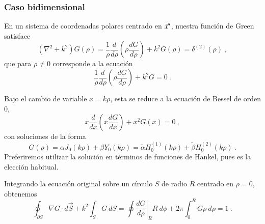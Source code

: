 \subsubsection{Caso bidimensional}

En un sistema de coordenadas polares centrado en $\vec{x}'$, nuestra función de Green satisface
\begin{equation}
    (\nabla^2 + k^2)G(\rho) = \frac{1}{\rho} \frac{d}{d\rho} \left( \rho \frac{dG}{d\rho} \right) + k^2 G(\rho) = \delta^{(2)}(\rho) \ ,
\end{equation}
que para $\rho \neq 0$ corresponde a la ecuación
\begin{equation}
    \frac{1}{\rho} \frac{d}{d\rho} \left( \rho \frac{dG}{d\rho} \right) + k^2 G = 0 \ .
\end{equation}

Bajo el cambio de variable $x = k\rho$, esta se reduce a la ecuación de Bessel de orden 0,
\begin{equation}
    x \frac{d}{dx}\left( x \frac{dG}{dx} \right)  + x^2 G(x) = 0 \ ,
\end{equation}
con soluciones de la forma
\begin{equation}\label{eq:solucion_green_Helmholtz_2d}
    G(\rho) = \alpha J_0(k\rho) + \beta Y_0(k\rho) = \tilde{\alpha} H_0^{(1)}(k\rho) + \tilde{\beta} H_0^{(2)}(k\rho) \ .
\end{equation}
Preferiremos utilizar la solución en términos de funciones de Hankel, pues es la elección habitual.

Integrando la ecuación original sobre un círculo $S$ de radio $R$ centrado en $\rho = 0$, obtenemos
\begin{equation}
    \oint_{\partial S} \nabla G \cdot d\vec{S} + k^2 \int_S G \ dS = \oint \left. \frac{dG}{d\rho}\right|_R R \ d\phi + 2\pi \int_0^R G \rho \ d\rho = 1 \ .
\end{equation}

